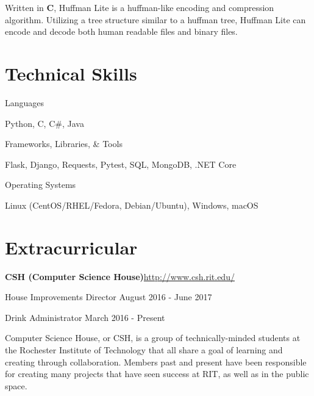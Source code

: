 \documentclass[margin,line]{resume}
\newcommand{\rurl}[1]{\hfill {\footnotesize \url{#1}}}
\begin{document}
\begin{resume}
\begin{asparablank}
		\small Written in \textbf{C}, Huffman Lite is a huffman-like encoding and compression algorithm. Utilizing a 
        tree structure similar to a huffman tree, Huffman Lite can encode and decode both human readable files and 
        binary files.
		\normalsize
	\end{asparablank}

\section{\mysidestyle Technical Skills}
	\begin{compactdesc}
		\item[Languages] \begin{inparaenum} { \small
			Python, C, C\#, Java
		} \end{inparaenum}
        \item[Frameworks, Libraries, \& Tools] \begin{inparaenum} { \small
        	Flask, Django, Requests, Pytest, SQL, MongoDB, .NET Core
        } \end{inparaenum}
		\item[Operating Systems] \begin{inparaenum} { \small
			Linux (CentOS/RHEL/Fedora, Debian/Ubuntu), Windows, macOS
		} \end{inparaenum}
        \normalsize
	\end{compactdesc}

\section{\mysidestyle Extracurricular}
	\begin{asparablank}
		\item {\bf CSH ({\small Computer Science House})}\rurl{http://www.csh.rit.edu/}
		\small	\item House Improvements Director \hfill August 2016 - June 2017
        \small  \item Drink Administrator \hfill March 2016 - Present
        \linebreak

        \small Computer Science House, or CSH, is a group of technically-minded students at the Rochester Institute of Technology that all share a goal of learning and creating through collaboration. Members past and present have been responsible for creating many projects that have seen success at RIT, as well as in the public space.
	\end{asparablank}


\end{resume}
\end{document}
